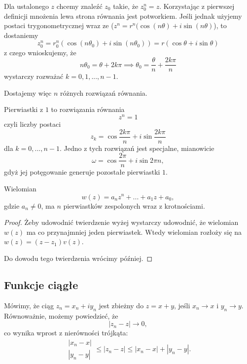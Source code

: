 \begin{example}
  \item Dla ustalonego $z$ chcemy znaleźć $z_0$ takie, że $z_0^n=z$. Korzystając z pierwszej definicji mnożenia lewa strona równania jest potworkiem. Jeśli jednak użyjemy postaci trygonometrycznej wraz ze  ($z^n=r^n(\cos(n\theta)+i\sin(n\theta)$), to dostaniemy 
    $$z_0^n=r_0^n(\cos(n\theta_0)+i\sin(n\theta_0))=r(\cos\theta+i\sin\theta)$$
    z czego wnioskujemy, że 
    $$n\theta_0=\theta+2k\pi\implies \theta_0=\frac{\theta}{n}+\frac{2k\pi}{n}$$
    wystarczy rozważać $k=0, 1,..., n-1$.

    Dostajemy więc $n$ różnych rozwiązań równania.
  \item Pierwiastki z $1$ to rozwiązania równania
    $$z^n=1$$
    czyli liczby postaci
    $$z_k=\cos\frac{2k\pi}{n}+i\sin\frac{2k\pi}{n}$$
    dla $k=0,...,n-1$. Jedno z tych rozwiązań jest specjalne, mianowicie
    $$\omega=\cos\frac{2\pi}{n}+i\sin{2\pi}{n},$$
    gdyż jej potęgowanie generuje pozostałe pierwiastki $1$.
\end{example}

\begin{theorem}
  Wielomian 
  $$w(z)=a_nz^n+...+a_1z+a_0,$$
  gdzie $a_n\neq 0$, ma $n$ pierwiastków zespolonych wraz z krotnościami.
\end{theorem}

\begin{proof}
  Żeby udowodnić twierdzenie wyżej wystarczy udowodnić, że wielomian $w(z)$ ma co przynajmniej jeden pierwiastek. Wtedy wielomian rozłoży się na $w(z)=(z-z_1)v(z)$.

  Do dowodu tego twierdzenia wrócimy później.
\end{proof}

\subsection{Funkcje ciągłe}

\begin{definition}
  Mówimy, że ciąg $z_n=x_n+iy_n$ jest zbieżny do $z=x+y$, jeśli $x_n\to x$ i $y_n\to y$. Równoważnie, możemy powiedzieć, że 
  $$|z_n-z|\to 0,$$
  co wynika wprost z nierówności trójkąta:
  $$\begin{matrix}|x_n-x|\\|y_n-y|\end{matrix}\leq |z_n-z|\leq |x_n-x|+|y_n-y|.$$
\end{definition}

